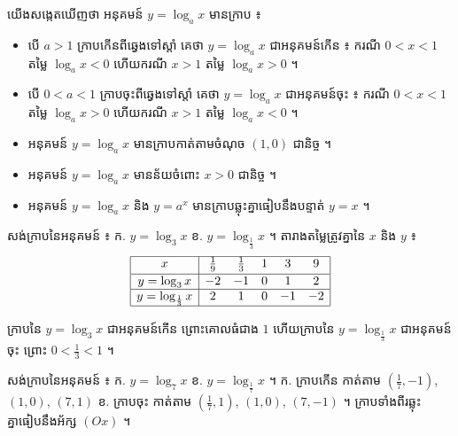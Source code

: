 យើងសង្កេតឃើញថា អនុគមន៍ $y = \log_a x$ មានក្រាប ៖
\begin{itemize}
  \item បើ $a > 1$ ក្រាបកើនពីឆ្វេងទៅស្ដាំ គេថា $y = \log_a x$ ជាអនុគមន៍កើន ៖ ករណី $0 < x < 1$ តម្លៃ $\log_a x < 0$ ហើយករណី $x > 1$ តម្លៃ $\log_a x > 0$ ។
  \item បើ $0 < a < 1$ ក្រាបចុះពីឆ្វេងទៅស្ដាំ គេថា $y = \log_a x$ ជាអនុគមន៍ចុះ ៖ ករណី $0 < x < 1$ តម្លៃ $\log_a x > 0$ ហើយករណី $x > 1$ តម្លៃ $\log_a x < 0$ ។
  \item អនុគមន៍ $y = \log_a x$ មានក្រាបកាត់តាមចំណុច $(1, 0)$ ជានិច្ច ។
  \item អនុគមន៍ $y = \log_a x$ មានន័យចំពោះ $x > 0$ ជានិច្ច ។
  \item អនុគមន៍ $y = \log_a x$ និង $y = a^x$ មានក្រាបឆ្លុះគ្នាធៀបនឹងបន្ទាត់ $y = x$ ។
\end{itemize}

\begin{example}[លំហាត់គំរូ]
សង់ក្រាបនៃអនុគមន៍ ៖ \quad ក. $y = \log_3 x$ \quad ខ. $y = \log_{\frac{1}{3}} x$ ។
\ans
តារាងតម្លៃត្រូវគ្នានៃ $x$ និង $y$ ៖
\[
\begin{array}{|c|ccccc|}\hline
x & \frac{1}{9} & \frac{1}{3} & 1 & 3 & 9\\[2pt] \hline
y = \log_3 x & -2 & -1 & 0 & 1 & 2\\ \hline
y = \log_{\frac{1}{3}} x & 2 & 1 & 0 & -1 & -2\\ \hline
\end{array}
\]
\begin{center}
\end{center}
ក្រាបនៃ $y = \log_3 x$ ជាអនុគមន៍កើន ព្រោះគោលធំជាង $1$ ហើយក្រាបនៃ $y = \log_{\frac{1}{3}} x$ ជាអនុគមន៍ចុះ ព្រោះ $0 < \frac{1}{3} < 1$ ។
\end{example}

\begin{pro}
សង់ក្រាបនៃអនុគមន៍ ៖ \quad ក. $y = \log_7 x$ \quad ខ. $y = \log_{\frac{1}{7}} x$ ។
\ans
ក. ក្រាបកើន កាត់តាម $\left(\frac{1}{7}, -1\right)$, $(1, 0)$, $(7, 1)$ \quad ខ. ក្រាបចុះ កាត់តាម $\left(\frac{1}{7}, 1\right)$, $(1, 0)$, $(7, -1)$ ។ ក្រាបទាំងពីរឆ្លុះគ្នាធៀបនឹងអ័ក្ស $(Ox)$ ។
\end{pro}

